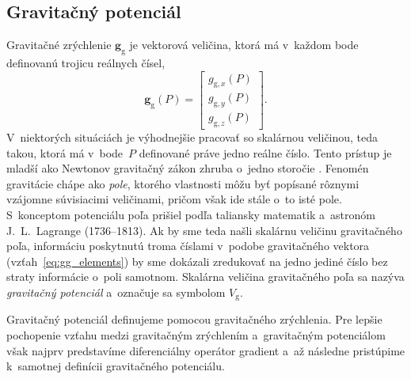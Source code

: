 \documentclass[a4paper, 12pt]{book}
\newcommand{\gidx}{\mathrm g}
\let\vec\mathbf
\begin{document}
\subsection{Gravitačný potenciál}
\label{sec:vg}

Gravitačné zrýchlenie $\vec g_\gidx$ je vektorová veličina, ktorá má v~každom
bode definovanú trojicu reálnych čísel,
%
\begin{equation}
\label{eq:gg_elements}
\vec g_{\gidx}(P) =
\begin{bmatrix}
g_{\gidx,x}(P) \\[2ex]
g_{\gidx,y}(P) \\[2ex]
g_{\gidx,z}(P)
\end{bmatrix}
{.}
\end{equation}
%
V~niektorých situáciách je výhodnejšie pracovať so skalárnou veličinou, teda
takou, ktorá má v~bode~$P$ definované práve jedno reálne číslo.  Tento prístup
je mladší ako Newtonov gravitačný zákon zhruba o~jedno storočie
\citep{MacMillan1930,Jekeli2015}.  Fenomén gravitácie chápe ako \emph{pole},
ktorého vlastnosti môžu byť popísané rôznymi vzájomne súvisiacimi veličinami,
pričom však ide stále o~to isté pole.  S~konceptom potenciálu poľa prišiel
podľa \cite{MacMillan1930} taliansky matematik a~astronóm J.~L.~Lagrange
(1736--1813).  Ak by sme teda našli skalárnu veličinu gravitačného poľa,
informáciu poskytnutú troma číslami v~podobe gravitačného vektora
(vzťah~\ref{eq:gg_elements}) by sme dokázali zredukovať na jedno jediné číslo
bez straty informácie o~poli samotnom.  Skalárna veličina gravitačného poľa sa
nazýva \emph{gravitačný potenciál} a~označuje sa symbolom $V_\gidx$.

Gravitačný potenciál definujeme pomocou gravitačného zrýchlenia.  Pre lepšie
pochopenie vzťahu medzi gravitačným zrýchlením a~gravitačným potenciálom však
najprv predstavíme diferenciálny operátor gradient a~až následne pristúpime
k~samotnej definícii gravitačného potenciálu.
\end{document}
